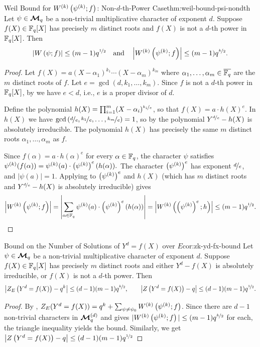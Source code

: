 \begin{Theorem}{Weil Bound for $W^{(k)}\left(\psi^{(k)};f\right)$: Non-$d$-th-Power Case}{thm:weil-bound-psi-nondth}
  Let $\psi\in\boldsymbol{\mathcal{M}}_q$ be a non-trivial multiplicative character of exponent $d$. Suppose $f(X)\in\mathbb{F}_q[X]$ has precisely $m$ distinct roots and $f(X)$ is not a $d$-th power in $\mathbb{F}_q[X]$. Then
  $$\left|W\left(\psi;f\right)\right|\leq (m-1)q^{\nicefrac12}\quad\text{and}\quad \left|W^{(k)}\left(\psi^{(k)};f\right)\right|\leq (m-1)q^{\nicefrac{k}2}.$$
\end{Theorem}
\begin{proof}
  Let $f(X)=a(X-\alpha_1)^{k_1}\cdots(X-\alpha_m)^{k_m}$ where $\alpha_1,\dots,\alpha_m\in\overline{\mathbb{F}_q}$ are the $m$ distinct roots of $f$. Let $e=\gcd(d,k_1,\dots,k_m)$. Since $f$ is not a $d$-th power in $\mathbb{F}_q[X]$, by \DthPowerCharlem we have $e<d$, i.e., $e$ is a proper divisor of $d$.

  Define the polynomial $h(X)=\prod_{i=1}^m(X-\alpha_i)^{\nicefrac{k_i}{e}}$, so that $f(X)=a\cdot h(X)^e$. In $h(X)$ we have $\gcd\left(\nicefrac{d}{e},\nicefrac{k_1}{e},\dots,\nicefrac{k_m}{e}\right)=1$, so by \YdFxIrrthm the polynomial $Y^{\nicefrac{d}{e}}-h(X)$ is absolutely irreducible. The polynomial $h(X)$ has precisely the same $m$ distinct roots $\alpha_1,\dots,\alpha_m$ as $f$.

  Since $f(\alpha)=a\cdot h(\alpha)^e$ for every $\alpha\in\mathbb{F}_q$, the character $\psi$ satisfies $\psi^{(k)}(f(\alpha))=\psi^{(k)}(a)\cdot\left(\psi^{(k)}\right)^e(h(\alpha)).$
  The character $\left(\psi^{(k)}\right)^e$ has exponent $\nicefrac{d}{e}$, and $|\psi(a)|=1$. Applying \WeilBoundPsiIrrthm to $\left(\psi^{(k)}\right)^e$ and $h(X)$ (which has $m$ distinct roots and $Y^{\nicefrac{d}{e}}-h(X)$ is absolutely irreducible) gives
  $$\left|W^{(k)}\left(\psi^{(k)};f\right)\right|=\left|\sum_{\alpha\in\mathbb{F}_q}\psi^{(k)}(a)\cdot\left(\psi^{(k)}\right)^e(h(\alpha))\right|=\left|W^{(k)}\left(\left(\psi^{(k)}\right)^e;h\right)\right|\leq (m-1)q^{\nicefrac12}.$$
\end{proof}

\begin{corolary}{Bound on the Number of Solutions of $Y^d=f(X)$ over $ E$}{cor:zk-yd-fx-bound}
  Let $\psi\in\boldsymbol{\mathcal{M}}_q$ be a non-trivial multiplicative character of exponent $d$. Suppose $f(X)\in\mathbb{F}_q[X]$ has precisely $m$ distinct roots and either $Y^d-f(X)$ is absolutely irreducible, or $f(X)$ is not a $d$-th power. Then 
  $$\left|Z_E\left(Y^d=f(X)\right)-q^k\right|\leq (d-1)(m-1)q^{\nicefrac{k}2}, \qquad \left|Z\left(Y^d=f(X)\right)-q\right|\leq (d-1)(m-1)q^{\nicefrac{1}2}.$$
\end{corolary}
\begin{proof}
  By \YdFxCharSumlem, $Z_E(Y^d=f(X))=q^k+\sum_{\psi\neq\psi_0}W^{(k)}\left(\psi^{(k)};f\right)$. Since there are $d-1$ non-trivial characters in $\boldsymbol{\mathcal{M}}_q^{(d)}$ and  gives $|W^{(k)}\left(\psi^{(k)};f\right)|\leq (m-1)q^{\nicefrac{k}2}$ for each, the triangle inequality yields the bound. Similarly, we get $\left|Z\left(Y^d=f(X)\right)-q\right|\leq (d-1)(m-1)q^{\nicefrac{1}2}$
\end{proof}
